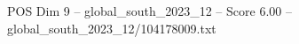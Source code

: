 \begin{textsample}{POS Dim 9 – global\_south\_2023\_12 – Score 6.00 – global\_south\_2023\_12/104178009.txt}
\end{textsample}
